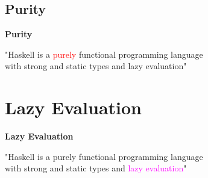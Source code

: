 \documentclass[unknownkeysallowed]{beamer}
\begin{document}

\subsection{Purity}
\begin{frame}

    \begin{center}
    \Large\textbf{Purity}
    \end{center}

\end{frame}


\begin{frame}
\begin{center}

  "Haskell is a \textcolor{red}{purely} functional programming language \\ with strong and static types and lazy evaluation"
  
\end{center}
\end{frame}

  
\section{Lazy Evaluation}
\begin{frame}

    \begin{center}
    \Large\textbf{Lazy Evaluation}
    \end{center}

\end{frame}


\begin{frame}
\begin{center}

  "Haskell is a purely functional programming language \\ with strong and static types and \textcolor{magenta}{lazy evaluation}"
  
\end{center}
\end{frame}
\end{document}
